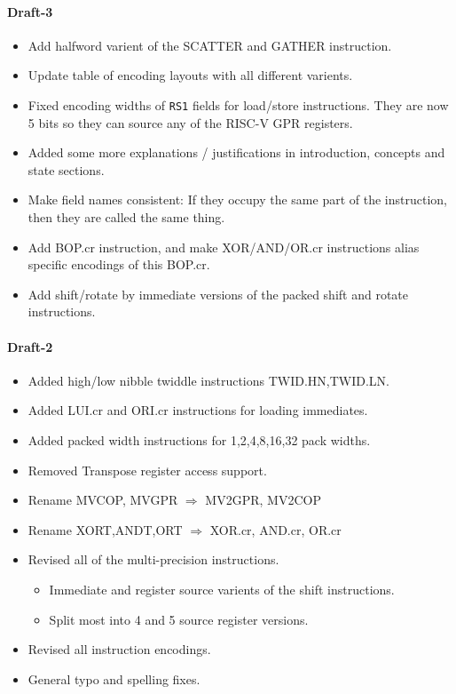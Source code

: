 \paragraph{Draft-3}
\begin{itemize}
\item Add halfword varient of the SCATTER and GATHER instruction.
\item Update table of encoding layouts with all different varients.
\item Fixed encoding widths of {\tt RS1} fields for load/store
    instructions. They are now 5 bits so they can source any of the
    RISC-V GPR registers.
\item Added some more explanations / justifications in introduction,
    concepts and state sections.
\item Make field names consistent: If they occupy the same part of
    the instruction, then they are called the same thing.
\item Add BOP.cr instruction, and make XOR/AND/OR.cr instructions
    alias specific encodings of this BOP.cr.
\item Add shift/rotate by immediate versions of the packed
    shift and rotate instructions.
\end{itemize}


\paragraph{Draft-2}
\begin{itemize}
\item Added high/low nibble twiddle instructions TWID.HN,TWID.LN.
\item Added LUI.cr and ORI.cr instructions for loading immediates.
\item Added packed width instructions for 1,2,4,8,16,32 pack widths.
\item Removed Transpose register access support.
\item Rename MVCOP, MVGPR  $\Rightarrow$ MV2GPR, MV2COP
\item Rename XORT,ANDT,ORT $\Rightarrow$ XOR.cr, AND.cr, OR.cr
\item Revised all of the multi-precision instructions.
\begin{itemize}
    \item Immediate and register source varients of the shift instructions.
    \item Split most into 4 and 5 source register versions.
\end{itemize}
\item Revised all instruction encodings.
\item General typo and spelling fixes.
\end{itemize}

